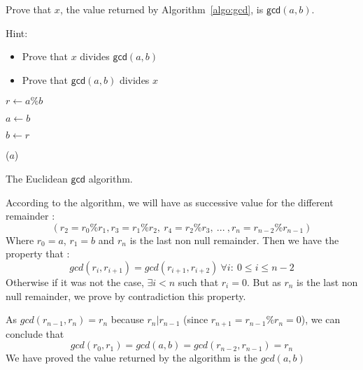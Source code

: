 Prove that $x$, the value returned by Algorithm~\ref{algo:gcd}, is $\mathsf{gcd} (a,b)$.

Hint:
\begin{itemize}
\item Prove that $x$ divides  $ \mathsf{gcd} (a,b)$
\item Prove that $ \mathsf{gcd} (a,b)$ divides $x$
\end{itemize}

\begin{algorithm}
	
	{
		$r \leftarrow a\%b$\;
		
		$a \leftarrow b$\;	
		
		$b \leftarrow r$\;	
	}
	\Return($a$)
	
\caption{The Euclidean $\mathsf{gcd}$ algorithm.}\label{algo:gcd}
\end{algorithm}
\begin{solution}
According to the algorithm, we will have as successive value for the different remainder : 
$$ (r_2 = r_0 \% r_1, r_3 = r_1 \% r_2, \ r_4 = r_2 \% r_3, \ ... \ , r_n =  r_{n-2} \% r_{n-1})$$
Where $r_0 = a$, $r_1 = b$ and $r_n$ is the last non null remainder. Then we have the property that :
$$ gcd(r_{i}, r_{i+1}) = gcd(r_{i+1}, r_{i+2}) \ \forall i : \ 0 \leq i \leq n - 2 $$
Otherwise if it was not the case, $\exists i < n $ such that $r_i = 0$. But as $r_n$ is the last non null remainder, we prove by contradiction this property.

As $gcd(r_{n-1}, r_n) = r_n $ because $r_n | r_{n-1}$ (since $r_{n+1} = r_{n-1} \% r_n = 0$), we can conclude that 
$$ gcd(r_0, r_1) = gcd(a, b) = gcd(r_{n-2}, r_{n-1}) = r_n$$
We have proved the value returned by the algorithm is the $gcd(a,b)$
\end{solution}

